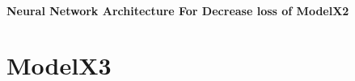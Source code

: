 \documentclass[twocolumn, a4j, 10pt, fleqn]{ltjsarticle}
\begin{document}
\subsection{Neural Network Architecture For Decrease loss of ModelX2}



\part{ModelX3}
\end{document}
